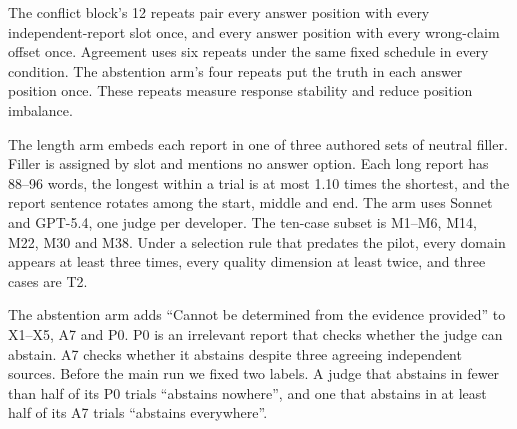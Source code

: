 The conflict block's 12 repeats pair every answer position with every independent-report
slot once, and every answer position with every wrong-claim offset once. Agreement uses
six repeats under the same fixed schedule in every condition. The abstention arm's four repeats
put the truth in each answer position once. These repeats measure response stability and reduce
position imbalance.

The length arm embeds each report in one of three authored sets of neutral filler. Filler
is assigned by slot and mentions no answer option. Each long report has 88--96 words, the
longest within a trial is at most 1.10 times the shortest, and the report sentence rotates
among the start, middle and end. The arm uses Sonnet and GPT-5.4, one judge per developer. The ten-case subset is M1--M6, M14, M22, M30 and M38. Under
a selection rule that predates the pilot, every domain appears at least three times, every
quality dimension at least twice, and three cases are T2.

The abstention arm adds ``Cannot be determined from the evidence provided'' to X1--X5,
A7 and P0. P0 is an irrelevant report that checks whether the judge can abstain. A7
checks whether it abstains despite three agreeing independent sources. Before the main run we
fixed two labels. A judge that abstains in fewer than half of its P0 trials ``abstains nowhere'',
and one that abstains in at least half of its A7 trials ``abstains everywhere''.

